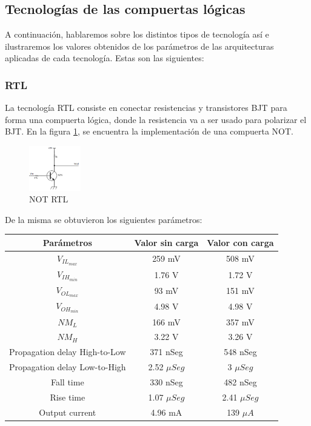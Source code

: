 \subsection{Tecnologías de las compuertas lógicas}
A continuación, hablaremos sobre los distintos tipos de tecnología así e ilustraremos los valores obtenidos de los parámetros de las arquitecturas aplicadas de cada tecnología. Estas son las siguientes:

\subsubsection{RTL}
La tecnología RTL consiste en conectar resistencias y transistores BJT para forma una compuerta lógica, donde la resistencia va a ser usado para polarizar el BJT. En la figura \ref{fig:eje1_1}, se encuentra la implementación de una compuerta NOT.
\begin{figure}[H]
	\centering
	\includegraphics[width=0.2\textwidth]{Ejercicio1/RTL.png}
	\caption{NOT RTL}
	\label{fig:eje1_1}
\end{figure}
De la misma se obtuvieron los siguientes parámetros:
\begin{table}[H]
	\centering
	\begin{tabular}{|c|c|c|}
		\hline
		Parámetros & Valor sin carga & Valor con carga\\
		\hline
		$V_{IL_{max}}$ & 259 mV & 508 mV\\
		\hline
		$V_{IH_{min}}$ & 1.76 V & 1.72 V\\
		\hline
		$V_{OL_{max}}$ & 93 mV & 151 mV\\
		\hline
		$V_{OH_{min}}$ & 4.98 V & 4.98 V\\
		\hline
		$NM_{L}$ & 166 mV & 357 mV\\
		\hline
		$NM_{H}$ & 3.22 V & 3.26 V\\
		\hline
		Propagation delay High-to-Low & 371 nSeg &  548 nSeg\\
		\hline
		Propagation delay Low-to-High & 2.52 $\mu Seg$ &  3 $\mu Seg$\\
		\hline
		Fall time & 330 nSeg & 482 nSeg \\
		\hline
		Rise time & 1.07 $\mu Seg$ & 2.41 $\mu Seg$\\
		\hline
		Output current & 4.96 mA & 139 $\mu A$\\
		\hline
	\end{tabular}
\end{table}

